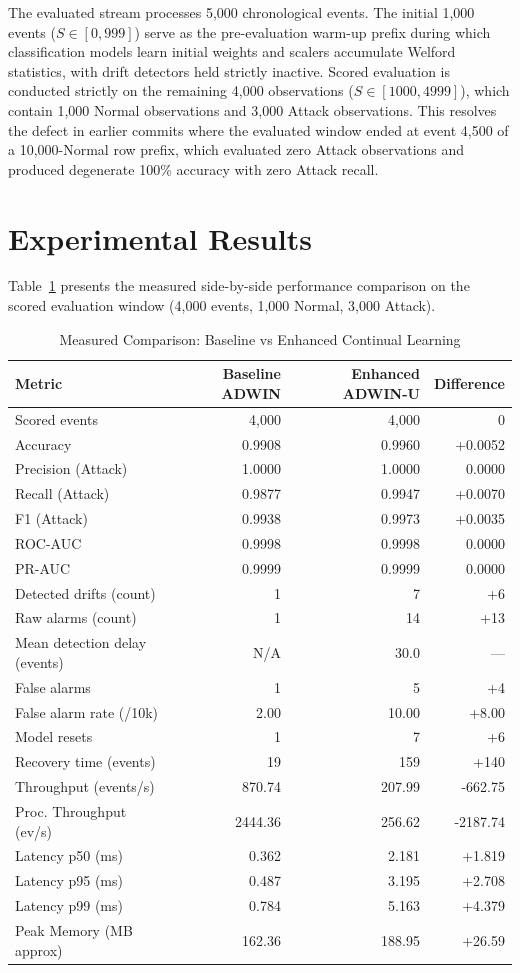 \documentclass[conference]{IEEEtran}
\begin{document}
The evaluated stream processes 5,000 chronological events. The initial 1,000 events ($S \in [0, 999]$) serve as the pre-evaluation warm-up prefix during which classification models learn initial weights and scalers accumulate Welford statistics, with drift detectors held strictly inactive. Scored evaluation is conducted strictly on the remaining 4,000 observations ($S \in [1000, 4999]$), which contain 1,000 Normal observations and 3,000 Attack observations. This resolves the defect in earlier commits where the evaluated window ended at event 4,500 of a 10,000-Normal row prefix, which evaluated zero Attack observations and produced degenerate 100\% accuracy with zero Attack recall.

\section{Experimental Results}
Table~\ref{tab:comparison} presents the measured side-by-side performance comparison on the scored evaluation window (4,000 events, 1,000 Normal, 3,000 Attack).

\begin{table}[ht]
\centering
\caption{Measured Comparison: Baseline vs Enhanced Continual Learning}
\label{tab:comparison}
\begin{tabular}{lrrr}
\toprule
Metric & Baseline ADWIN & Enhanced ADWIN-U & Difference \\
\midrule
Scored events & 4,000 & 4,000 & 0 \\
Accuracy & 0.9908 & 0.9960 & +0.0052 \\
Precision (Attack) & 1.0000 & 1.0000 & 0.0000 \\
Recall (Attack) & 0.9877 & 0.9947 & +0.0070 \\
F1 (Attack) & 0.9938 & 0.9973 & +0.0035 \\
ROC-AUC & 0.9998 & 0.9998 & 0.0000 \\
PR-AUC & 0.9999 & 0.9999 & 0.0000 \\
Detected drifts (count) & 1 & 7 & +6 \\
Raw alarms (count) & 1 & 14 & +13 \\
Mean detection delay (events) & N/A & 30.0 & --- \\
False alarms & 1 & 5 & +4 \\
False alarm rate (/10k) & 2.00 & 10.00 & +8.00 \\
Model resets & 1 & 7 & +6 \\
Recovery time (events) & 19 & 159 & +140 \\
Throughput (events/s) & 870.74 & 207.99 & -662.75 \\
Proc. Throughput (ev/s) & 2444.36 & 256.62 & -2187.74 \\
Latency p50 (ms) & 0.362 & 2.181 & +1.819 \\
Latency p95 (ms) & 0.487 & 3.195 & +2.708 \\
Latency p99 (ms) & 0.784 & 5.163 & +4.379 \\
Peak Memory (MB approx) & 162.36 & 188.95 & +26.59 \\
\bottomrule
\end{tabular}
\end{table}
\end{document}
